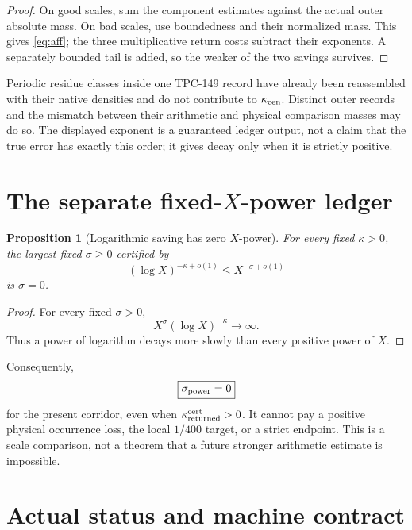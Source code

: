 \documentclass[11pt]{article}
\newtheorem{proposition}[theorem]{Proposition}
\theoremstyle{definition}
\theoremstyle{remark}
\begin{document}
\begin{proof}
On good scales, sum the component estimates against the actual outer
absolute mass.  On bad scales, use boundedness and their normalized
mass.  This gives \eqref{eq:aff}; the three multiplicative return
costs subtract their exponents.  A separately bounded tail is added,
so the weaker of the two savings survives.
\end{proof}

Periodic residue classes inside one TPC-149 record have already been
reassembled with their native densities and do not contribute to
\(\kappa_{\rm cen}\).  Distinct outer records and the mismatch
between their arithmetic and physical comparison masses may do so.
The displayed exponent is a guaranteed ledger output, not a claim
that the true error has exactly this order; it gives decay only when
it is strictly positive.

\section{The separate fixed-\texorpdfstring{\(X\)}{X}-power ledger}

\begin{proposition}[Logarithmic saving has zero \(X\)-power]
\label{prop:zero-power}
For every fixed \(\kappa>0\), the largest fixed
\(\sigma\ge0\) certified by
\[
 (\log X)^{-\kappa+o(1)}
 \le X^{-\sigma+o(1)}
\]
is \(\sigma=0\).
\end{proposition}

\begin{proof}
For every fixed \(\sigma>0\),
\[
 X^\sigma(\log X)^{-\kappa}\longrightarrow\infty.
\]
Thus a power of logarithm decays more slowly than every positive
power of \(X\).
\end{proof}

Consequently,
\begin{equation}
 \boxed{\sigma_{\rm power}=0}
\label{eq:power}
\end{equation}
for the present corridor, even when
\(\kappa_{\rm returned}^{\rm cert}>0\).  It cannot pay a positive physical
occurrence loss, the local \(1/400\) target, or a strict endpoint.
This is a scale comparison, not a theorem that a future stronger
arithmetic estimate is impossible.

\section{Actual status and machine contract}
\end{document}
